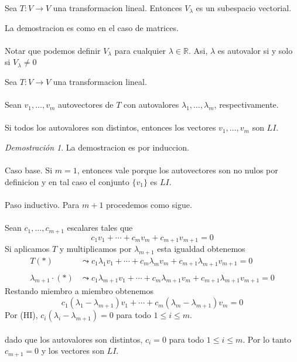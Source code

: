 \documentclass{article}
\theoremstyle{definition}
\theoremstyle{definition}
\theoremstyle{remark}
\newtheorem*{demo}{Demostración}
\begin{document}
\begin{teo}
  Sea $T : V \to V$ una transformacion lineal. Entonces $V_\lambda$ es un subespacio vectorial.  \end{teo}
  La demostracion es como en el caso de matrices.\\\\
Notar que podemos definir $V_\lambda$ para cualquier $\lambda \in \mathbb{R}$. Asi, $\lambda$ es autovalor si y solo si $V_\lambda \neq 0$ 
\begin{teo}
  Sea $T : V \to V$ una transformacion lineal. \\\\ Sean $v_1, \dots ,v_m$ autovectores de $T$ con autovalores $\lambda_1, \dots ,\lambda_m$, respectivamente. \\\\ Si todos los autovalores son distintos, entonces los vectores $v_1, \dots ,v_m$ son $LI$.
\end{teo}
\begin{demo}
  La demostracion es por induccion. \\\\ Caso base. Si $m=1$, entonces vale porque los autovectores son no nulos por definicion y en tal caso el conjunto $\{v_1\}$ es $LI$. \\\\ Paso inductivo. Para $m+1$ procedemos como sigue. \\\\ Sean $c_1, \dots ,c_{m+1}$ escalares tales que \begin{equation}
    c_1 v_1 + \cdots + c_m v_m + c_{m+1} v_{m+1}=0 \tag{*}
\end{equation}
Si aplicamos $T$ y multiplicamos por $\lambda_{m+1}$ esta igualdad obtenemos \[
  \begin{aligned}
    T(*) &\leadsto c_1 \lambda_1 v_1 + \cdots + c_m \lambda_m v_m + c_{m+1}\lambda_{m+1} v_{m+1} = 0 \\\\
    \lambda_{m+1} \cdot (*) & \leadsto c_1 \lambda_{m+1} v_{1} + \cdots + c_{m} \lambda_{m+1}v_{m}+c_{m+1}\lambda_{m+1}v_{m+1}=0
  \end{aligned}
\]
Restando miembro a miembro obtenemos \[
c_1(\lambda_1 - \lambda_{m+1})v_1+\cdots + c_m (\lambda_m - \lambda_{m+1})v_m = 0
\]
Por (HI), $c_i(\lambda_i - \lambda_{m+1})=0$ para todo $1 \leq i \leq m$. \\\\ dado que los autovalores son distintos, $c_i=0$ para todo $1 \leq i \leq m$. Por lo tanto $c_{m+1}=0$ y los vectores son $LI$.
\end{demo}
\end{document}
